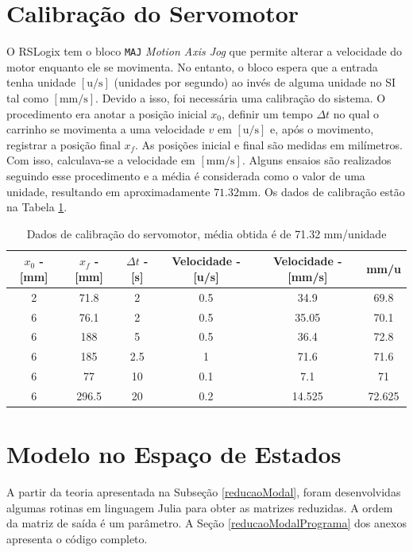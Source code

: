 \section{Calibração do Servomotor\label{calibracaoServomotorSecao}}

O RSLogix tem o bloco \texttt{MAJ} \textendash{} \textit{Motion Axis Jog} \textendash{} que permite alterar a velocidade do motor enquanto ele se movimenta. No entanto, o bloco espera que a entrada tenha unidade $[\mathrm{u}/\mathrm{s}]$ (unidades por segundo) ao invés de alguma unidade no SI tal como $[\mathrm{mm}/\mathrm{s}]$. Devido a isso, foi necessária uma calibração do sistema. O procedimento era anotar a posição inicial $x_0$, definir um tempo $\Delta t$ no qual o carrinho se movimenta a uma velocidade $v$ em $[\mathrm{u}/\mathrm{s}]$ e, após o movimento,  registrar a posição final $x_f$. As posições inicial e final são medidas em milímetros. Com isso, calculava-se a velocidade em $[\mathrm{mm}/\mathrm{s}]$. Alguns ensaios são realizados seguindo esse procedimento e a média é considerada como o valor de uma unidade, resultando em aproximadamente $71.32\mathrm{mm}$. Os dados de calibração estão na Tabela \ref{calibracaoServomotor}.

\begin{table}[!ht]
\centering
\caption{Dados de calibração do servomotor, média obtida é de 71.32 mm/unidade\label{calibracaoServomotor}}
\begin{tabular}{|c|c|c|c|c|c|}
\hline
	$x_0$ - [mm] & $x_f$ - [mm] & $\Delta t$ - [s] & Velocidade - [u/s] & Velocidade - [mm/s] & mm/u\\ \hline
2 &	71.8  &	2   &	0.5 &	34.9   & 	69.8\\ \hline
6 & 76.1  &	2   &	0.5 &	35.05  &	70.1\\ \hline
6 &	188	  &  5   &	0.5	&   36.4   &	72.8\\ \hline
6 &	185   &	2.5 &	1	& 	71.6   &	71.6\\ \hline
6 &	77    &	10  &	0.1	&   7.1    &	71\\ \hline
6 &	296.5 &	20	&   0.2 & 	14.525 &	72.625\\ \hline\end{tabular}
\end{table}

\section{Modelo no Espaço de Estados}

A partir da teoria apresentada na Subseção \ref{reducaoModal}, foram desenvolvidas algumas rotinas em linguagem Julia \cite{julia} para obter as matrizes reduzidas. A ordem da matriz de saída é um parâmetro. A Seção \ref{reducaoModalPrograma} dos anexos apresenta o código completo.

